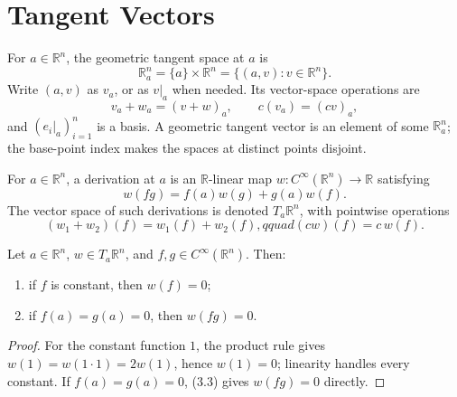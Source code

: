 

\section{Tangent Vectors}

\begin{definition}
\label{def:3-13-extra-1}




For $a\in\mathbb{R}^n$, the geometric tangent space at $a$ is
\[
\mathbb{R}^n_a=\{a\}\times\mathbb{R}^n
  =\{(a,v):v\in\mathbb{R}^n\}.
\]
Write $(a,v)$ as $v_a$, or as $v|_a$ when needed. Its vector-space operations are
\[
v_a+w_a=(v+w)_a,\qquad c(v_a)=(cv)_a,
\]
and $(e_i|_a)_{i=1}^n$ is a basis. A geometric tangent vector is an element of
some $\mathbb{R}^n_a$; the base-point index makes the spaces at distinct points
disjoint.
\end{definition}

\begin{definition}
\label{def:3-13-extra-2}



For $a\in\mathbb{R}^n$, a derivation at $a$ is an $\mathbb{R}$-linear map
$w:C^\infty(\mathbb{R}^n)\to\mathbb{R}$ satisfying
\[
w(fg)=f(a)w(g)+g(a)w(f). \tag{3.3}
\]
The vector space of such derivations is denoted $T_a\mathbb{R}^n$, with
pointwise operations
\[
(w_1+w_2)(f)=w_1(f)+w_2(f),qquad (cw)(f)=c\,w(f).
\]
\end{definition}

\begin{lemma}
\label{lem:3-1}




Let $a\in\mathbb{R}^n$, $w\in T_a\mathbb{R}^n$, and
$f,g\in C^\infty(\mathbb{R}^n)$. Then:
\begin{enumerate}
\item if $f$ is constant, then $w(f)=0$;
\item if $f(a)=g(a)=0$, then $w(fg)=0$.
\end{enumerate}
\end{lemma}

\begin{proof}

\sketch
For the constant function $1$, the product rule gives
$w(1)=w(1\cdot1)=2w(1)$, hence $w(1)=0$; linearity handles every constant.
If $f(a)=g(a)=0$, (3.3) gives $w(fg)=0$ directly.
\end{proof}

